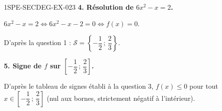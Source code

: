 \begin{corrige}{1SPE-SECDEG-EX-023}
\medskip
\textbf{4. Résolution de $6x^2 - x = 2$.}


$6x^2 - x = 2 \iff 6x^2 - x - 2 = 0 \iff f(x) = 0$.

D'après la question 1 : $\mathcal{S} = \left\{-\dfrac{1}{2}\,;\,\dfrac{2}{3}\right\}$.

\medskip
\textbf{5. Signe de $f$ sur $\left[-\dfrac{1}{2}\,;\,\dfrac{2}{3}\right]$.}


D'après le tableau de signes établi à la question 3, $f(x) \leqslant 0$ pour tout $x \in \left[-\dfrac{1}{2}\,;\,\dfrac{2}{3}\right]$ (nul aux bornes, strictement négatif à l'intérieur).

\end{corrige}
